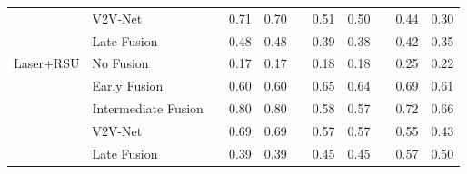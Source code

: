 \begin{table*}[ht]
\begin{tabular}{@{}lllcclcclcc@{}}
\multicolumn{1}{l|}{}                           & V2V-Net              &  & 0.71         & 0.70         &  & 0.51           & 0.50           &  & 0.44             & 0.30            \\
\multicolumn{1}{l|}{}                           & Late Fusion          &  & 0.48         & 0.48         &  & 0.39           & 0.38           &  & 0.42             & 0.35            \\ \midrule
\multicolumn{1}{l|}{\multirow{5}{*}{Laser+RSU}} & No Fusion &  & 0.17         & 0.17         &  & 0.18           & 0.18           &  & 0.25             & 0.22            \\
\multicolumn{1}{l|}{}                           & Early Fusion         &  & 0.60         & 0.60         &  & 0.65           & 0.64           &  & 0.69             & 0.61            \\
\multicolumn{1}{l|}{}                           & Intermediate Fusion  &  & 0.80         & 0.80         &  & 0.58           & 0.57           &  & 0.72             & 0.66            \\
\multicolumn{1}{l|}{}                           & V2V-Net              &  & 0.69         & 0.69         &  & 0.57           & 0.57           &  & 0.55             & 0.43            \\
\multicolumn{1}{l|}{}                           & Late Fusion          &  & 0.39         & 0.39         &  & 0.45           & 0.45           &  & 0.57             & 0.50            \\ \bottomrule
\end{tabular}
\end{table*}